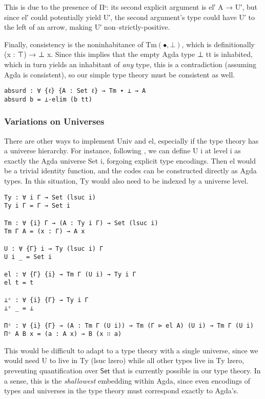 \documentclass{article}
\renewcommand{\_}{\textrm{\textscale{.5}{\textunderscore}}}
\newcommand{\Tm}{\mathrm{Tm}}
\newcommand{\Ty}{\mathrm{Ty}}
\newcommand{\univ}{\mathrm{Univ}}
\newcommand{\El}{\mathrm{el}}
\newcommand{\Set}{\mathsf{Set}}
\theoremstyle{definition}
\theoremstyle{plain}
\begin{document}
This is due to the presence of {\codefont Πᶜ}:
its second explicit argument is {\codefont el′ A → U′},
but since {\codefont el′} could potentially yield {\codefont U′},
the second argument's type could have {\codefont U′} to the left of an arrow,
making {\codefont U′} non--strictly-positive.

Finally, consistency is the noninhabitance of $\Tm(\bullet, \bot)$,
which is definitionally {\codefont (x : ⊤) → ⊥ x}.
Since this implies that the empty Agda type {\codefont ⊥ tt} is inhabited,
which in turn yields an inhabitant of \emph{any} type,
this is a contradiction (assuming Agda is consistent),
so our simple type theory must be consistent as well.

\begin{verbatim}
absurd : ∀ {ℓ} {A : Set ℓ} → Tm ∙ ⊥ → A
absurd b = ⊥-elim (b tt)
\end{verbatim}

\subsubsection{Variations on Universes}

There are other ways to implement $\univ$ and $\El$,
especially if the type theory has a universe hierarchy.
For instance, following \citet{shallow},
we can define {\codefont U i} at level {\codefont i} as exactly the Agda universe {\codefont Set i},
forgoing explicit type encodings.
Then {\codefont el} would be a trivial identity function,
and the codes can be constructed directly as Agda types.
In this situation, $\Ty$ would also need to be indexed by a universe level.

\begin{verbatim}
Ty : ∀ i Γ → Set (lsuc i)
Ty i Γ = Γ → Set i

Tm : ∀ {i} Γ → (A : Ty i Γ) → Set (lsuc i)
Tm Γ A = (x : Γ) → A x

U : ∀ {Γ} i → Ty (lsuc i) Γ
U i _ = Set i

el : ∀ {Γ} {i} → Tm Γ (U i) → Ty i Γ
el t = t

⊥ᶜ : ∀ {i} {Γ} → Ty i Γ
⊥ᶜ _ = ⊥

Πᶜ : ∀ {i} {Γ} → (A : Tm Γ (U i)) → Tm (Γ ⊳ el A) (U i) → Tm Γ (U i)
Πᶜ A B x = (a : A x) → B (x ∷ a)
\end{verbatim}

This would be difficult to adapt to a type theory with a single universe,
since we would need {\codefont U} to live in {\codefont Ty (lsuc lzero)}
while all other types live in {\codefont Ty lzero},
preventing quantification over $\Set$ that is currently possible in our type theory.
In a sense, this is the \emph{shallowest} embedding within Agda,
since even encodings of types and universes in the type theory must correspond exactly to Agda's.
\end{document}
